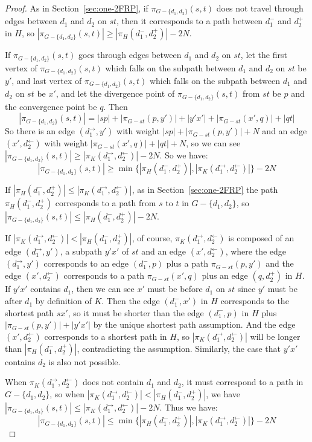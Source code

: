 \documentclass[11pt]{article}
\theoremstyle{plain}
\theoremstyle{definition}
\newcommand{\set}[1]{\{ #1 \}}
\newcommand{\og}[3]{\pi_{G-#3}\left(#1,#2\right)}
\begin{document}
\begin{proof}
As in Section~\ref{sec:one-2FRP}, if $\og{s}{t}{\set{d_1, d_2}}$ does not travel through edges between $d_1$ and $d_2$ on $st$, then it corresponds to a path between $d_1^-$ and $d_2^+$ in $H$, so $|\og{s}{t}{\set{d_1, d_2}}|\geq |\pi_H(d_1^-,d_2^+)|-2N$.

If $\og{s}{t}{\set{d_1, d_2}}$ goes through edges between $d_1$ and $d_2$ on $st$, let the first vertex of $\og{s}{t}{\set{d_1, d_2}}$ which falls on the subpath between $d_1$ and $d_2$ on $st$ be $y'$, and last vertex of $\og{s}{t}{\set{d_1, d_2}}$ which falls on the subpath between $d_1$ and $d_2$ on $st$ be $x'$, and let the divergence point of $\og{s}{t}{\set{d_1, d_2}}$ from $st$ be $p$ and the convergence point be $q$. Then 
$$|\og{s}{t}{\set{d_1, d_2}}|=|sp|+|\og{p}{y'}{st}|+|y'x'|+|\og{x'}{q}{st}|+|qt|$$
So there is an edge $(d_1^\rightarrow,y')$ with weight $|sp|+|\og{p}{y'}{st}|+N$ and an edge $(x',d_2^\leftarrow)$ with weight $|\og{x'}{q}{st}|+|qt|+N$, so we can see $|\og{s}{t}{\set{d_1, d_2}}|\geq |\pi_K(d_1^\rightarrow, d_2^\leftarrow)|-2N$. So we have:
 $$|\og{s}{t}{\set{d_1, d_2}}|\geq\min\{|\pi_H(d_1^-,d_2^+)|, |\pi_K(d_1^\rightarrow, d_2^\leftarrow)|\}-2N$$

If $|\pi_H(d_1^-,d_2^+)|\leq |\pi_K(d_1^\rightarrow, d_2^\leftarrow)|$, as in Section~\ref{sec:one-2FRP} the path $\pi_H(d_1^-,d_2^+)$ corresponds to a path from $s$ to $t$ in $G-\{d_1,d_2\}$, so $|\og{s}{t}{\set{d_1, d_2}}|\leq |\pi_H(d_1^-,d_2^+)|-2N$.

If $|\pi_K(d_1^\rightarrow, d_2^\leftarrow)|<|\pi_H(d_1^-,d_2^+)|$, of course, $\pi_K(d_1^\rightarrow, d_2^\leftarrow)$ is composed of an edge $(d_1^\rightarrow,y')$, a subpath $y'x'$ of $st$ and an edge $(x',d_2^\leftarrow)$, where the edge $(d_1^\rightarrow,y')$ corresponds to an edge $(d_1^-,p)$ plus a path $\og{p}{y'}{st}$ and the edge $(x',d_2^\leftarrow)$ corresponds to a path $\og{x'}{q}{st}$ plus an edge $(q,d_2^+)$ in $H$. If $y'x'$ contains $d_1$, then we can see $x'$ must be before $d_1$ on $st$ since $y'$ must be after $d_1$ by definition of $K$. Then the edge $(d_1^-,x')$ in $H$ corresponds to the shortest path $sx'$, so it must be shorter than the edge $(d_1^-,p)$ in $H$ plus  
$|\og{p}{y'}{st}|+|y'x'|$ by the unique shortest path assumption. And the edge $(x',d_2^\leftarrow)$ corresponds to a shortest path in $H$, so $|\pi_K(d_1^\rightarrow, d_2^\leftarrow)|$ will be longer than $|\pi_H(d_1^-,d_2^+)|$, contradicting the assumption. Similarly, the case that $y'x'$ contains $d_2$ is also not possible.

When $\pi_K(d_1^\rightarrow, d_2^\leftarrow)$ does not contain $d_1$ and $d_2$, it must correspond to a path in $G-\{d_1,d_2\}$, so when $|\pi_K(d_1^\rightarrow, d_2^\leftarrow)|<|\pi_H(d_1^-,d_2^+)|$, we have $|\og{s}{t}{\set{d_1, d_2}}|\leq |\pi_K(d_1^\rightarrow, d_2^\leftarrow)|-2N$. Thus we have:
$$|\og{s}{t}{\set{d_1, d_2}}|\leq\min\{|\pi_H(d_1^-,d_2^+)|, |\pi_K(d_1^\rightarrow, d_2^\leftarrow)|\}-2N$$
\end{proof}
\fi
\end{document}
